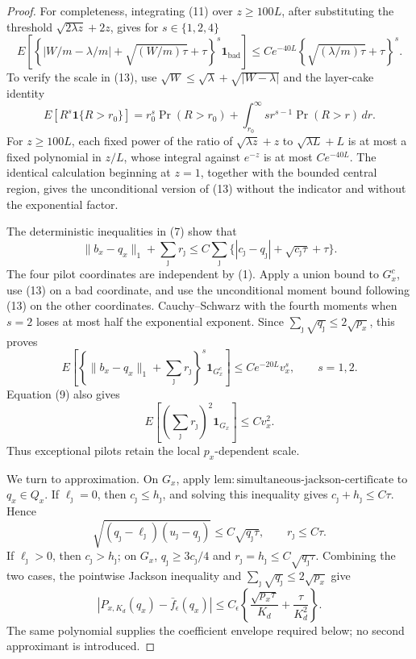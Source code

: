 \documentclass{article}
\begin{document}
\begin{proof}
For completeness, integrating (11) over \(z\geq100L\), after substituting the threshold \(\sqrt{2\lambda z}+2z\), gives for \(s\in\{1,2,4\}\)
\[
 E\!\left[
 \left\{|W/m-\lambda/m|+\sqrt{(W/m)\tau}+\tau\right\}^{s}
 \mathbf 1_{\mathrm{bad}}
 \right]
 \leq C e^{-40L}\left\{\sqrt{(\lambda/m)\tau}+\tau\right\}^{s}. \tag{13}
\]
To verify the scale in (13), use \(\sqrt W\leq\sqrt\lambda+\sqrt{|W-\lambda|}\) and the layer-cake identity
\[
 E[R^s\mathbf 1\{R>r_0\}]
 =r_0^s\Pr(R>r_0)+\int_{r_0}^{\infty}s r^{s-1}\Pr(R>r)\,dr.
\]
For \(z\geq100L\), each fixed power of the ratio of \(\sqrt{\lambda z}+z\) to \(\sqrt{\lambda L}+L\) is at most a fixed polynomial in \(z/L\), whose integral against \(e^{-z}\) is at most \(C e^{-40L}\).  The identical calculation beginning at \(z=1\), together with the bounded central region, gives the unconditional version of (13) without the indicator and without the exponential factor.

The deterministic inequalities in (7) show that
\[
 \|b_x-q_x\|_1+\sum_\jmath r_\jmath
 \leq C\sum_\jmath
 \{|c_\jmath-q_\jmath|+\sqrt{c_\jmath\tau}+\tau\}.              \tag{14}
\]
The four pilot coordinates are independent by (1).  Apply a union bound to \(G_x^c\), use (13) on a bad coordinate, and use the unconditional moment bound following (13) on the other coordinates.  Cauchy--Schwarz with the fourth moments when \(s=2\) loses at most half the exponential exponent.  Since \(\sum_\jmath\sqrt{q_\jmath}\leq2\sqrt{p_x}\), this proves
\[
 E\!\left[
 \left\{\|b_x-q_x\|_1+\sum_\jmath r_\jmath\right\}^{s}
 \mathbf1_{G_x^c}\right]
 \leq C e^{-20L}v_x^s,
 \qquad s=1,2.                                                      \tag{15}
\]
Equation (9) also gives
\[
 E\!\left[\left(\sum_\jmath r_\jmath\right)^2
 \mathbf1_{G_x}\right]\leq C v_x^2.                              \tag{16}
\]
Thus exceptional pilots retain the local \(p_x\)-dependent scale.

We turn to approximation.  On \(G_x\), apply \(\mathrm{lem:simultaneous\mbox{-}jackson\mbox{-}certificate}\) to \(q_x\in Q_x\).  If \(\ell_\jmath=0\), then \(c_\jmath\leq h_\jmath\), and solving this inequality gives \(c_\jmath+h_\jmath\leq C\tau\).  Hence
\[
 \sqrt{(q_\jmath-\ell_\jmath)(u_\jmath-q_\jmath)}
 \leq C\sqrt{q_\jmath\tau},
 \qquad r_\jmath\leq C\tau.                                    \tag{17}
\]
If \(\ell_\jmath>0\), then \(c_\jmath>h_\jmath\); on \(G_x\), \(q_\jmath\geq3c_\jmath/4\) and \(r_\jmath=h_\jmath\leq C\sqrt{q_\jmath\tau}\).  Combining the two cases, the pointwise Jackson inequality and \(\sum_\jmath\sqrt{q_\jmath}\leq2\sqrt{p_x}\) give
\[
 |P_{x,K_d}(q_x)-\bar f_\epsilon(q_x)|
 \leq C_\epsilon\left\{
 \frac{\sqrt{p_x\tau}}{K_d}+\frac{\tau}{K_d^2}\right\}.         \tag{18}
\]
The same polynomial supplies the coefficient envelope required below; no second approximant is introduced.


\end{proof}
\end{document}
